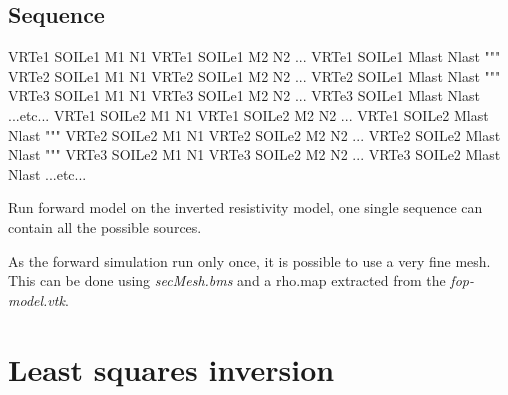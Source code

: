 \documentclass{article}
\begin{document}
\subsection{Sequence}

VRTe1 SOILe1 M1 N1\newline
VRTe1 SOILe1 M2 N2\newline
...\newline
VRTe1 SOILe1 Mlast Nlast\newline
"""\newline
VRTe2 SOILe1 M1 N1\newline
VRTe2 SOILe1 M2 N2\newline
...\newline
VRTe2 SOILe1 Mlast Nlast\newline
"""\newline
VRTe3 SOILe1 M1 N1\newline
VRTe3 SOILe1 M2 N2\newline
...\newline
VRTe3 SOILe1 Mlast Nlast\newline
...etc...
VRTe1 SOILe2 M1 N1\newline
VRTe1 SOILe2 M2 N2\newline
...\newline
VRTe1 SOILe2 Mlast Nlast\newline
"""\newline
VRTe2 SOILe2 M1 N1\newline
VRTe2 SOILe2 M2 N2\newline
...\newline
VRTe2 SOILe2 Mlast Nlast\newline
"""\newline
VRTe3 SOILe2 M1 N1\newline
VRTe3 SOILe2 M2 N2\newline
...\newline
VRTe3 SOILe2 Mlast Nlast\newline
...etc...

Run forward model on the inverted resistivity model, one single sequence can contain all the possible sources.

As the forward simulation run only once, it is possible to use a very fine mesh. This can be done using \textit{secMesh.bms} and a rho.map extracted from the \textit{fop-model.vtk}.

\section{Least squares inversion}
\end{document}
